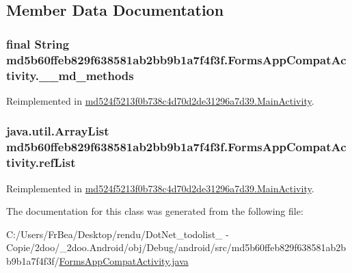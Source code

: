 \subsection{Member Data Documentation}
\hypertarget{classmd5b60ffeb829f638581ab2bb9b1a7f4f3f_1_1_forms_app_compat_activity_2cb4fae3ad0f7b38c85c94c344df5089}{
\subsubsection[{\_\-\_\-md\_\-methods}]{\setlength{\rightskip}{0pt plus 5cm}final String {\bf md5b60ffeb829f638581ab2bb9b1a7f4f3f.FormsAppCompatActivity.\_\-\_\-md\_\-methods}}}
\label{classmd5b60ffeb829f638581ab2bb9b1a7f4f3f_1_1_forms_app_compat_activity_2cb4fae3ad0f7b38c85c94c344df5089}




Reimplemented in \hyperlink{classmd524f5213f0b738c4d70d2de31296a7d39_1_1_main_activity_0700c8dda689213437fb119dde5ff411}{md524f5213f0b738c4d70d2de31296a7d39.MainActivity}.\hypertarget{classmd5b60ffeb829f638581ab2bb9b1a7f4f3f_1_1_forms_app_compat_activity_3c2387fd0251d4204c05843857d67c60}{
\subsubsection[{refList}]{\setlength{\rightskip}{0pt plus 5cm}java.util.ArrayList {\bf md5b60ffeb829f638581ab2bb9b1a7f4f3f.FormsAppCompatActivity.refList}}}
\label{classmd5b60ffeb829f638581ab2bb9b1a7f4f3f_1_1_forms_app_compat_activity_3c2387fd0251d4204c05843857d67c60}




Reimplemented in \hyperlink{classmd524f5213f0b738c4d70d2de31296a7d39_1_1_main_activity_bb20fe5f20e2a815a5bc013b63706a44}{md524f5213f0b738c4d70d2de31296a7d39.MainActivity}.

The documentation for this class was generated from the following file:\begin{CompactItemize}
\item 
C:/Users/FrBea/Desktop/rendu/DotNet\_\-todolist\_ - Copie/2doo/\_\-2doo.Android/obj/Debug/android/src/md5b60ffeb829f638581ab2bb9b1a7f4f3f/\hyperlink{_forms_app_compat_activity_8java}{FormsAppCompatActivity.java}\end{CompactItemize}
